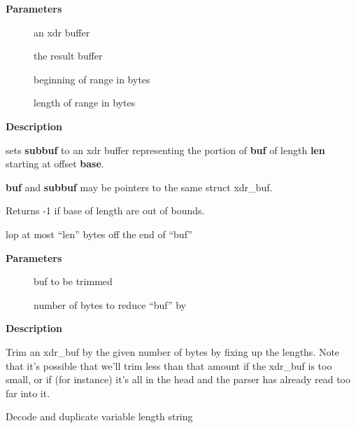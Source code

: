 \documentclass[a4paper,8pt,english]{sphinxmanual}
\begin{document}
\textbf{Parameters}
\begin{description}
\item[{}] \leavevmode
an xdr buffer

\item[{}] \leavevmode
the result buffer

\item[{}] \leavevmode
beginning of range in bytes

\item[{}] \leavevmode
length of range in bytes

\end{description}

\textbf{Description}

sets \textbf{subbuf} to an xdr buffer representing the portion of \textbf{buf} of
length \textbf{len} starting at offset \textbf{base}.

\textbf{buf} and \textbf{subbuf} may be pointers to the same struct xdr\_buf.

Returns -1 if base of length are out of bounds.

\begin{fulllineitems}
\label{networking/kapi:c.xdr_buf_trim}
lop at most ``len'' bytes off the end of ``buf''

\end{fulllineitems}


\textbf{Parameters}
\begin{description}
\item[{}] \leavevmode
buf to be trimmed

\item[{}] \leavevmode
number of bytes to reduce ``buf'' by

\end{description}

\textbf{Description}

Trim an xdr\_buf by the given number of bytes by fixing up the lengths. Note
that it's possible that we'll trim less than that amount if the xdr\_buf is
too small, or if (for instance) it's all in the head and the parser has
already read too far into it.

\begin{fulllineitems}
\label{networking/kapi:c.xdr_stream_decode_string_dup}
Decode and duplicate variable length string

\end{fulllineitems}
\end{document}
